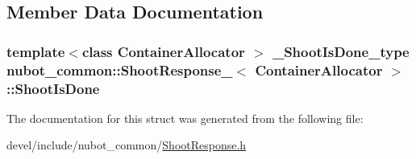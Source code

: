 \subsection{Member Data Documentation}
\hypertarget{structnubot__common_1_1ShootResponse___aa2de339585d1e01374d7227f1c9e84f6}{
\subsubsection[{Shoot\-Is\-Done}]{\setlength{\rightskip}{0pt plus 5cm}template$<$class Container\-Allocator $>$ {\bf \-\_\-\-Shoot\-Is\-Done\-\_\-type} {\bf nubot\-\_\-common\-::\-Shoot\-Response\-\_\-}$<$ Container\-Allocator $>$\-::Shoot\-Is\-Done}}\label{structnubot__common_1_1ShootResponse___aa2de339585d1e01374d7227f1c9e84f6}


The documentation for this struct was generated from the following file\-:\begin{DoxyCompactItemize}
\item 
devel/include/nubot\-\_\-common/\hyperlink{ShootResponse_8h}{Shoot\-Response.\-h}\end{DoxyCompactItemize}

